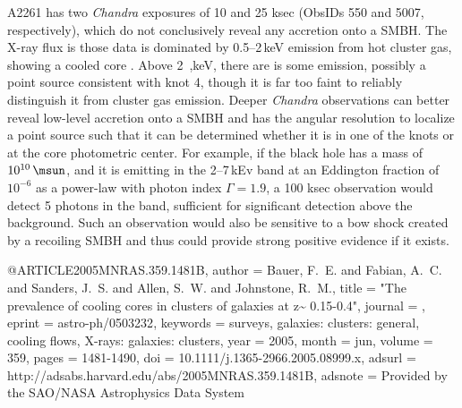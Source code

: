 A2261 has two \emph{Chandra} exposures of 10 and 25 ksec (ObsIDs 550 and 5007, respectively), which do not conclusively reveal any accretion onto a SMBH.  The X-ray flux is those data is dominated by 0.5--2\,keV emission from hot cluster gas, showing a cooled core \citep{2005MNRAS.359.1481B}.  Above 2\
,keV, there are is some emission, possibly a point source consistent with knot 4, though it is far too faint to reliably distinguish it from cluster gas emission.  Deeper \emph{Chandra} observations can better reveal low-level accretion onto a SMBH and has the angular resolution to localize a point source such that it can be determined whether it is in one of the knots or at the core photometric center.  For example, if the black hole has a mass of $10^{10}\,\msun$, and it is emitting in the 2--7\,kEv band at an Eddington fraction of $10^{-6}$ as a power-law with photon index $\Gamma = 1.9$, a 100 ksec observation would detect 5 photons in the band, sufficient for significant detection above the background.  Such an observation would also be sensitive to a bow shock created by a recoiling SMBH and thus could provide strong positive evidence if it exists.


@ARTICLE{2005MNRAS.359.1481B,
   author = {{Bauer}, F.~E. and {Fabian}, A.~C. and {Sanders}, J.~S. and 
	{Allen}, S.~W. and {Johnstone}, R.~M.},
    title = "{The prevalence of cooling cores in clusters of galaxies at z\~{} 0.15-0.4}",
  journal = {\mnras},
   eprint = {astro-ph/0503232},
 keywords = {surveys, galaxies: clusters: general, cooling flows, X-rays: galaxies: clusters},
     year = 2005,
    month = jun,
   volume = 359,
    pages = {1481-1490},
      doi = {10.1111/j.1365-2966.2005.08999.x},
   adsurl = {http://adsabs.harvard.edu/abs/2005MNRAS.359.1481B},
  adsnote = {Provided by the SAO/NASA Astrophysics Data System}
}
